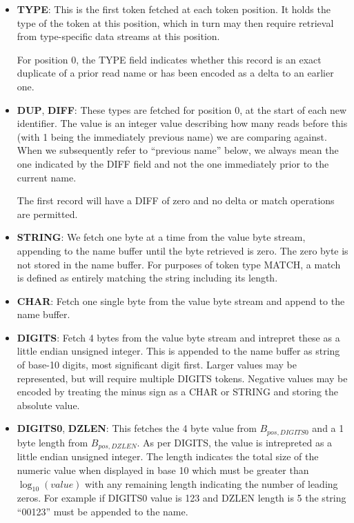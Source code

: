 \documentclass[a4paper]{article}
\begin{document}
\begin{itemize}
\item{\textbf{TYPE}:}
This is the first token fetched at each token position.  It holds the
type of the token at this position, which in turn may then require
retrieval from type-specific data streams at this position.

For position 0, the TYPE field indicates whether this record is an
exact duplicate of a prior read name or has been encoded as a delta to
an earlier one.

\item{\textbf{DUP}, \textbf{DIFF}:}
These types are fetched for position 0, at the start of each new
identifier.  The value is an integer value describing how many reads
before this (with 1 being the immediately previous name) we are
comparing against.  When we subsequently refer to ``previous name'' below, we
always mean the one indicated by the DIFF field and not the one
immediately prior to the current name.

The first record will have a DIFF of zero and no delta or match
operations are permitted.

\item{\textbf{STRING}:}
We fetch one byte at a time from the value byte stream, appending to the
name buffer until the byte retrieved is zero.  The zero byte is not
stored in the name buffer.
For purposes of token type MATCH, a match is defined as entirely
matching the string including its length.

\item{\textbf{CHAR}:}
Fetch one single byte from the value byte stream and append to the name buffer.

\item{\textbf{DIGITS}:}
Fetch 4 bytes from the value byte stream and intrepret these as a little
endian unsigned integer.  This is appended to the name buffer as
string of base-10 digits, most significant digit first.  Larger
values may be represented, but will require multiple DIGITS tokens.
Negative values may be encoded by treating the minus sign as a CHAR or
STRING and storing the absolute value.

\item{\textbf{DIGITS0}, \textbf{DZLEN}:}
This fetches the 4 byte value from $B_{pos,DIGITS0}$ and a 1 byte
length from $B_{pos,DZLEN}$.  As per DIGITS, the value is intrepreted as a
little endian unsigned integer.  The length indicates the total
size of the numeric value when displayed in base 10 which must be
greater than $\log_{10}(value)$ with any remaining length indicating
the number of leading zeros.  For example if DIGITS0 value is 123 and
DZLEN length is 5 the string ``00123'' must be appended to the name.


\end{itemize}
\end{document}
